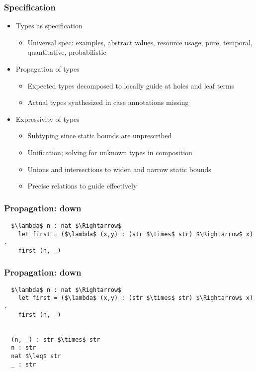 \documentclass{beamer}
\begin{document}
\begin{frame}[fragile]
  \frametitle{Specification}
  \begin{itemize}
  \item Types as specification 
    \begin{itemize}
    \item Universal spec: examples, abstract values, resource usage, 
      pure, temporal, quantitative, probabilistic 
    \end{itemize}
  \item Propagation of types   
    \begin{itemize}
    \item Expected types decomposed to locally guide at holes and leaf terms   
    \item Actual types synthesized in case annotations missing 
    \end{itemize}

  \item Expressivity of types    
    \begin{itemize}
    \item Subtyping since static bounds are unprescribed 
    \item Unification; solving for unknown types in composition 
    \item Unions and intersections to widen and narrow static bounds 
    \item Precise relations to guide effectively   
    \end{itemize}
  \end{itemize}
\end{frame}

\begin{frame}[fragile]
  \frametitle{Propagation: down}

  \begin{lstlisting}
  $\lambda$ n : nat $\Rightarrow$
    let first = ($\lambda$ (x,y) : (str $\times$ str) $\Rightarrow$ x) .
    first (n, _) 
  \end{lstlisting}

\end{frame}

\begin{frame}[fragile]
  \frametitle{Propagation: down}

  \begin{lstlisting}
  $\lambda$ n : nat $\Rightarrow$
    let first = ($\lambda$ (x,y) : (str $\times$ str) $\Rightarrow$ x) .
    first (n, _) 

    
  (n, _) : str $\times$ str
  n : str   
  nat $\leq$ str 
  _ : str  
  \end{lstlisting}

\end{frame}
\end{document}

